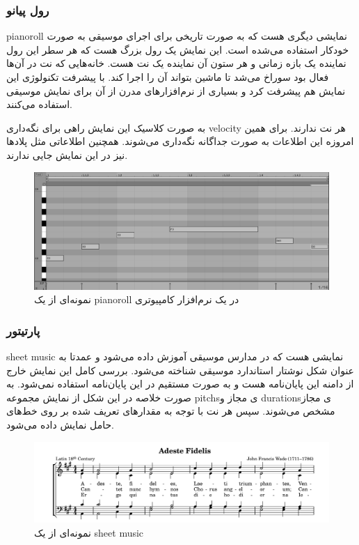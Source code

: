 \subsubsection{رول پیانو}
\gls{pianoroll} نمایشی دیگری هست که به صورت تاریخی برای اجرای موسیقی به صورت
خودکار استفاده می‌شده است. این نمایش یک رول بزرگ هست که هر سطر این رول نماینده
یک بازه زمانی و هر ستون آن نماینده یک نت هست. خانه‌هایی که نت در آن‌ها فعال بود
سوراخ می‌شد تا ماشین بتواند آن را اجرا کند. با پیشرفت تکنولوژی این نمایش هم
پیشرفت کرد و بسیاری از نرم‌افزارهای مدرن از آن برای نمایش موسیقی استفاده
می‌کنند.

به صورت کلاسیک این نمایش راهی برای نگه‌داری \gls{velocity} هر نت ندارند. برای
همین امروزه این اطلاعات به صورت جداگانه نگه‌داری می‌شوند. همچنین اطلاعاتی مثل
پلادها نیز در این نمایش جایی ندارند.
\begin{figure}
    \centering
    \includegraphics[width=12cm]{./statics/midi_piano_roll.png}
    \caption{نمونه‌ای از یک \gls{pianoroll} در یک نرم‌افزار کامپیوتری}
\end{figure}

\subsubsection{پارتیتور}
\gls{sheet music} نمایشی هست که در مدارس موسیقی آموزش داده می‌شود و عمدتا به
عنوان شکل نوشتار استاندارد موسیقی شناخته می‌شود. بررسی کامل این نمایش خارج از
دامنه‌ این پایان‌نامه هست و به صورت مستقیم در این پایان‌نامه استفاده نمی‌شود. به
صورت خلاصه در این شکل از نمایش مجموعه \glspl{pitch}ی مجاز و \glspl{duration}ی‌
مجاز مشخص می‌شوند. سپس هر نت با توجه به مقدارهای تعریف شده بر روی خط‌های حامل
نمایش داده می‌شود.
\begin{figure}
    \centering
    \includegraphics[width=12cm]{./statics/sheet_music.png}
    \caption{نمونه‌ای از یک \gls{sheet music}}
\end{figure}

